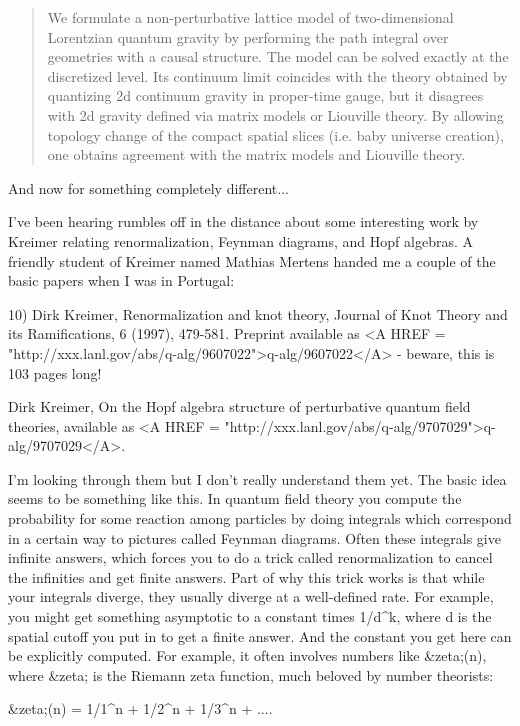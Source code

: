 \begin{quote}
	We formulate a non-perturbative lattice model of
   	two-dimensional Lorentzian quantum gravity by performing the
	path integral over geometries with a causal structure. The
	model can be solved exactly at the discretized level. Its
	continuum limit coincides with the theory obtained by
	quantizing 2d continuum gravity in proper-time gauge, but it
	disagrees with 2d gravity defined via matrix models or
	Liouville theory. By allowing topology change of the compact
	spatial slices (i.e. baby universe creation), one obtains
	agreement with the matrix models and Liouville theory.
\end{quote}
And now for something completely different...

I've been hearing rumbles off in the distance about some interesting
work by Kreimer relating renormalization, Feynman diagrams, and Hopf
algebras.  A friendly student of Kreimer named Mathias Mertens
handed me a couple of the basic papers when I was in Portugal:

10) Dirk Kreimer, Renormalization and knot theory, Journal of Knot
Theory and its Ramifications, 6 (1997), 479-581.  Preprint available as
<A HREF = "http://xxx.lanl.gov/abs/q-alg/9607022">q-alg/9607022</A> -
beware, this is 103 pages long!

Dirk Kreimer, On the Hopf algebra structure of perturbative quantum
field theories, available as <A HREF =
"http://xxx.lanl.gov/abs/q-alg/9707029">q-alg/9707029</A>.

I'm looking through them but I don't really understand them yet.  
The basic idea seems to be something like this.  In quantum field
theory you compute the probability for some reaction among particles
by doing integrals which correspond in a certain way to pictures
called Feynman diagrams.  Often these integrals give infinite answers,
which forces you to do a trick called renormalization to cancel the
infinities and get finite answers.  Part of why this trick works is
that while your integrals diverge, they usually diverge at a well-defined 
rate.  For example, you might get something asymptotic to a constant 
times 1/d^k, where d is the spatial cutoff you put in to get a finite 
answer.  And the constant you get here can be explicitly computed.  
For example, it often involves numbers like &zeta;(n), where &zeta; is the 
Riemann zeta function, much beloved by number theorists:

           &zeta;(n) = 1/1^{n} + 1/2^{n} + 1/3^{n} + ....


